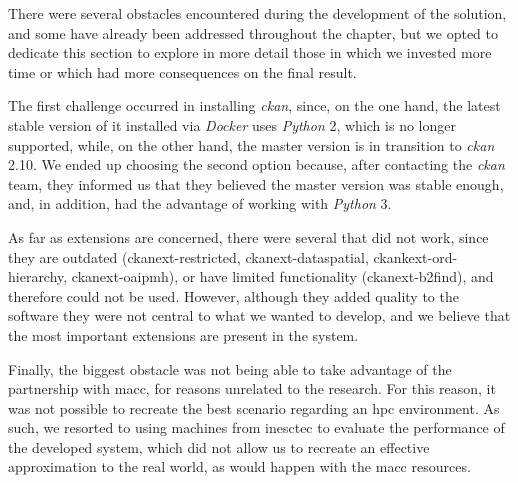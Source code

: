 There were several obstacles encountered during the development of the solution, and some have already been addressed throughout the chapter, but we opted to dedicate this section to explore in more detail those in which we invested more time or which had more consequences on the final result.

The first challenge occurred in installing \textit{\gls{ckan}}, since, on the one hand, the latest stable version of it installed via \textit{Docker} uses \textit{Python} 2, which is no longer supported, while, on the other hand, the master version is in transition to \textit{\textit{\gls{ckan}}} 2.10. We ended up choosing the second option because, after contacting the \textit{\gls{ckan}} team, they informed us that they believed the master version was stable enough, and, in addition, had the advantage of working with \textit{Python} 3.
  
As far as extensions are concerned, there were several that did not work, since they are outdated (ckanext-restricted, ckanext-dataspatial, ckankext-ord-hierarchy, ckanext-oaipmh), or have limited functionality (ckanext-b2find), and therefore could not be used. However, although they added quality to the software they were not central to what we wanted to develop, and we believe that the most important extensions are present in the system.
 
Finally, the biggest obstacle was not being able to take advantage of the partnership with \gls{macc}, for reasons unrelated to the research. For this reason, it was not possible to recreate the best scenario regarding an \gls{hpc} environment. As such, we resorted to using machines from \gls{inesctec} to evaluate the performance of the developed system, which did not allow us to recreate an effective approximation to the real world, as would happen with the \gls{macc} resources.